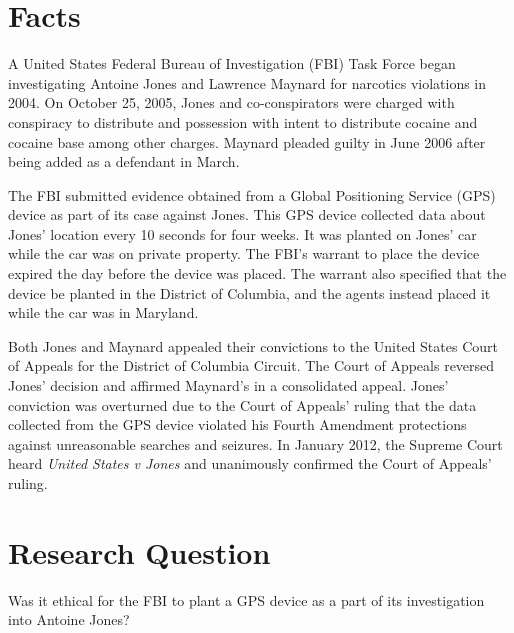 \documentclass[12pt]{article}
\begin{document}
\begin{multicols}{2}
\setcounter{page}{1}
\section{Facts}
A United States Federal Bureau of Investigation (FBI) Task Force began investigating Antoine Jones and Lawrence Maynard for
narcotics violations in 2004. \cite{maynarddecision} On October 25, 2005, Jones
and co-conspirators were charged with conspiracy to distribute and possession
with intent to distribute cocaine and cocaine base among other charges. 
\cite{maynarddecision} Maynard pleaded guilty in June 2006 after being added as a
defendant in March. \cite{maynarddecision} 

The FBI submitted evidence obtained from a Global Positioning Service (GPS) device as part of its case against Jones. \cite{maynarddecision} 
This GPS device collected data about Jones' location every 10 seconds for four weeks. \cite{effjones}
It was planted on Jones' car while the car was on private property. \cite{effjones}
The FBI's warrant to place the device expired the day before the device was placed. \cite{usvjonesopinions}
The warrant also specified that the device be planted in the District of Columbia, and the agents instead placed it while the car was in Maryland. \cite{usvjonesopinions}

Both Jones and Maynard appealed their convictions 
to the United States Court of Appeals for the District of Columbia 
Circuit.
The Court of Appeals reversed Jones' decision and affirmed Maynard's in a consolidated 
appeal. \cite{maynarddecision}
Jones' conviction was overturned due to the Court of Appeals' ruling that the data
collected from the GPS device violated his Fourth Amendment protections
against unreasonable searches and seizures. \cite{nytimes} In January 2012, the
Supreme Court heard \textit{United States v Jones} and unanimously confirmed the Court of Appeals' ruling. \cite{effjones}

\section{Research Question}
Was it ethical for the FBI to plant a GPS device as a part of its investigation into Antoine Jones?


\end{multicols}
\end{document}

